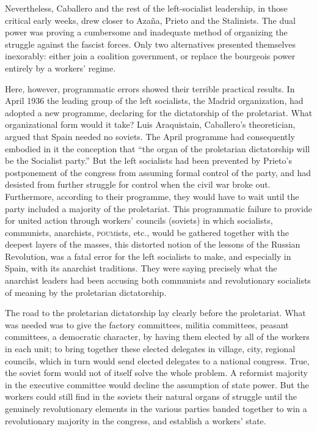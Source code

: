 Nevertheless, Caballero and the rest of the left-socialist leadership, in those critical early weeks, drew closer to Azaña, Prieto and the Stalinists. The dual power was proving a cumbersome and inadequate method of organizing the struggle against the fascist forces. Only two alternatives presented themselves inexorably: either join a coalition government, or replace the bourgeois power entirely by a workers’ regime.

Here, however, programmatic errors showed their terrible practical results. In April 1936 the leading group of the left socialists, the Madrid organization, had adopted a new programme, declaring for the dictatorship of the proletariat. What organizational form would it take? Luis Araquistain, Caballero’s theoretician, argued that Spain needed no soviets. The April programme had consequently embodied in it the conception that ``the organ of the proletarian dictatorship will be the Socialist party.'' But the left socialists had been prevented by Prieto’s postponement of the congress from assuming formal control of the party, and had desisted from further struggle for control when the civil war broke out. Furthermore, according to their programme, they would have to wait until the party included a majority of the proletariat. This programmatic failure to provide for united action through workers’ councils (soviets) in which socialists, communists, anarchists, \textsc{poum}ists, etc., would be gathered together with the deepest layers of the masses, this distorted notion of the lessons of the Russian Revolution, was a fatal error for the left socialists to make, and especially in Spain, with its anarchist traditions. They were saying precisely what the anarchist leaders had been accusing both communists and revolutionary socialists of meaning by the proletarian dictatorship.

The road to the proletarian dictatorship lay clearly before the proletariat. What was needed was to give the factory committees, militia committees, peasant committees, a democratic character, by having them elected by all of the workers in each unit; to bring together these elected delegates in village, city, regional councils, which in turn would send elected delegates to a national congress. True, the soviet form would not of itself solve the whole problem. A reformist majority in the executive committee would decline the assumption of state power. But the workers could still find in the soviets their natural organs of struggle until the genuinely revolutionary elements in the various parties banded together to win a revolutionary majority in the congress, and establish a workers’ state.

